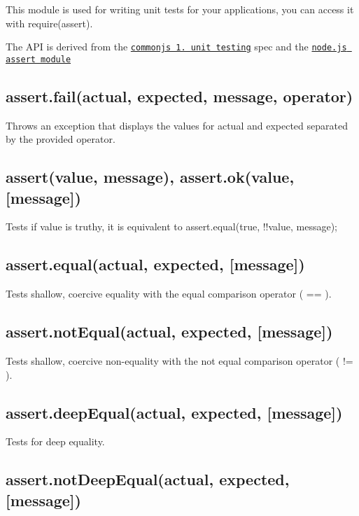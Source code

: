 \href{https://travis-ci.org/defunctzombie/commonjs-assert}{\tt }

This module is used for writing unit tests for your applications, you can access it with require(\textquotesingle{}assert\textquotesingle{}).

The A\+PI is derived from the \href{http://wiki.commonjs.org/wiki/Unit_Testing/1.0}{\tt commonjs 1. unit testing} spec and the \href{http://nodejs.org/api/assert.html}{\tt node.\+js assert module}

\subsection*{assert.\+fail(actual, expected, message, operator)}

Throws an exception that displays the values for actual and expected separated by the provided operator.

\subsection*{assert(value, message), assert.\+ok(value, \mbox{[}message\mbox{]})}

Tests if value is truthy, it is equivalent to assert.\+equal(true, !!value, message);

\subsection*{assert.\+equal(actual, expected, \mbox{[}message\mbox{]})}

Tests shallow, coercive equality with the equal comparison operator ( == ).

\subsection*{assert.\+not\+Equal(actual, expected, \mbox{[}message\mbox{]})}

Tests shallow, coercive non-\/equality with the not equal comparison operator ( != ).

\subsection*{assert.\+deep\+Equal(actual, expected, \mbox{[}message\mbox{]})}

Tests for deep equality.

\subsection*{assert.\+not\+Deep\+Equal(actual, expected, \mbox{[}message\mbox{]})}

